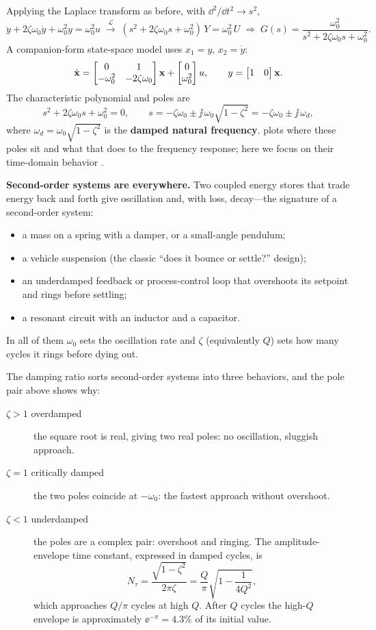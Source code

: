 Applying the Laplace transform as before, with \(\dd^2/\dd t^2\to s^2\),
\[
\ddot y+2\zeta\omega_0\dot y+\omega_0^2 y=\omega_0^2u
\;\xrightarrow{\;\mathcal L\;}\;
(s^2+2\zeta\omega_0 s+\omega_0^2)\,Y=\omega_0^2\,U
\;\Rightarrow\;
G(s)=\frac{\omega_0^2}{s^2+2\zeta\omega_0 s+\omega_0^2}.
\]
A companion-form state-space model uses \(x_1=y\), \(x_2=\dot{y}\):
\[
\dot{\mathbf{x}}=
\begin{bmatrix}0 & 1\\ -\omega_0^2 & -2\zeta\omega_0\end{bmatrix}\mathbf{x}
+\begin{bmatrix}0\\ \omega_0^2\end{bmatrix}u,
\qquad
y=\begin{bmatrix}1 & 0\end{bmatrix}\mathbf{x} .
\]
The characteristic polynomial and poles are
\[
s^2+2\zeta\omega_0 s+\omega_0^2=0,
\qquad
s=-\zeta\omega_0\pm\jj\,\omega_0\sqrt{1-\zeta^2}
=-\zeta\omega_0\pm\jj\,\omega_d,
\]
where \(\omega_d=\omega_0\sqrt{1-\zeta^2}\) is the \textbf{damped natural
frequency}.  plots where these poles sit and what that does to
the frequency response; here we focus on their time-domain behavior
\cite[pp.~42--44, 57--58]{leigh2012control}.

\begin{physicalbox}
\textbf{Second-order systems are everywhere.} Two coupled energy stores that
trade energy back and forth give oscillation and, with loss, decay---the
signature of a second-order system:
\begin{itemize}
\item a mass on a spring with a damper, or a small-angle pendulum;
\item a vehicle suspension (the classic ``does it bounce or settle?'' design);
\item an underdamped feedback or process-control loop that overshoots its
setpoint and rings before settling;
\item a resonant circuit with an inductor and a capacitor.
\end{itemize}
In all of them \(\omega_0\) sets the oscillation rate and \(\zeta\) (equivalently
\(Q\)) sets how many cycles it rings before dying out.
\end{physicalbox}

The damping ratio sorts second-order systems into three behaviors, and the pole
pair above shows why:
\begin{description}
\item[\(\zeta>1\) overdamped] the square root is real, giving two real poles: no
oscillation, sluggish approach.
\item[\(\zeta=1\) critically damped] the two poles coincide at \(-\omega_0\):
the fastest approach without overshoot.
\item[\(\zeta<1\) underdamped] the poles are a complex pair: overshoot and
ringing. The amplitude-envelope time constant, expressed in damped cycles, is
\[
N_\tau=\frac{\sqrt{1-\zeta^2}}{2\pi\zeta}
=\frac{Q}{\pi}\sqrt{1-\frac{1}{4Q^2}},
\]
which approaches \(Q/\pi\) cycles at high \(Q\). After \(Q\) cycles the high-\(Q\)
envelope is approximately \(\ee^{-\pi}=4.3\%\) of its initial value.
\end{description}

